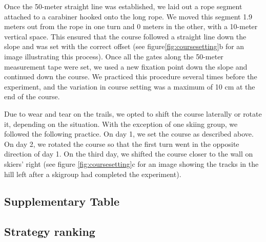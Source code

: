 \documentclass{article}
\begin{document}
Once the 50-meter straight line was established, we laid out a rope segment attached to a carabiner hooked onto the long rope. We moved this segment 1.9 meters out from the rope in one turn and 0 meters in the other, with a 10-meter vertical space. This ensured that the course followed a straight line down the slope and was set with the correct offset (see figure\ref{fig:coursesetting}b for an image illustrating this process). Once all the gates along the 50-meter measurement tape were set, we used a new fixation point down the slope and continued down the course. We practiced this procedure several times before the experiment, and the variation in course setting was a maximum of 10 cm at the end of the course.

Due to wear and tear on the trails, we opted to shift the course laterally or rotate it, depending on the situation. With the exception of one skiing group, we followed the following practice. On day 1, we set the course as described above. On day 2, we rotated the course so that the first turn went in the opposite direction of day 1. On the third day, we shifted the course closer to the wall on skiers' right (see figure \ref{fig:coursesetting}c for an image showing the tracks in the hill left after a skigroup had completed the experiment). 

\subsection{Supplementary Table}
\subsection{Strategy ranking}\label{suptable_strategyranking}
\clearpage
\end{document}
